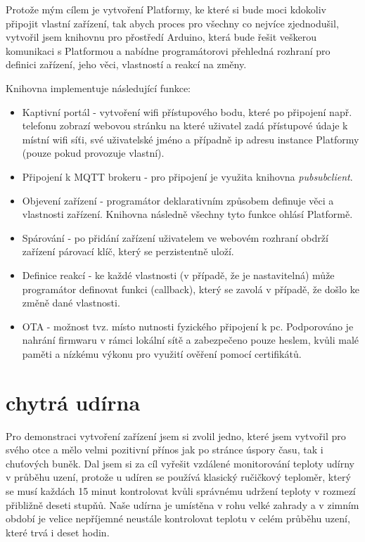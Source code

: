 Protože mým cílem je vytvoření Platformy, ke které si bude moci kdokoliv připojit vlastní zařízení, tak abych proces pro všechny co nejvíce zjednodušil, vytvořil jsem knihovnu pro přostředí Arduino, která bude řešit veškerou komunikaci s Platformou a nabídne programátorovi přehledná rozhraní pro definici zařízení, jeho věci, vlastností a reakcí na změny.

Knihovna implementuje následující funkce:
\begin{itemize}
    \item Kaptivní portál - vytvoření wifi přístupového bodu, které po připojení např. telefonu zobrazí webovou stránku na které uživatel zadá přístupové údaje k místní wifi síťi, své uživatelské jméno a případně ip adresu instance Platformy (pouze pokud provozuje vlastní).
    \item Připojení k MQTT brokeru - pro připojení je využita knihovna \textit{pubsubclient}.
    \item Objevení zařízení - programátor deklarativním způsobem definuje věci a vlastnosti zařízení. Knihovna následně všechny tyto funkce ohlásí Platformě.
    \item Spárování - po přidání zařízení uživatelem ve webovém rozhraní obdrží zařízení párovací klíč, který se perzistentně uloží.
    \item Definice reakcí - ke každé vlastnosti (v případě, že je nastavitelná) může programátor definovat funkci (callback), který se zavolá v případě, že došlo ke změně dané vlastnosti.
    \item OTA - možnost tvz.  místo nutnosti fyzického připojení k pc. Podporováno je nahrání firmwaru v rámci lokální sítě a zabezpečeno pouze heslem, kvůli malé paměti a nízkému výkonu pro využití ověření pomocí certifikátů.
\end{itemize}

\section{chytrá udírna} %
Pro demonstraci vytvoření zařízení jsem si zvolil jedno, které jsem vytvořil pro svého otce a mělo velmi pozitivní přínos jak po stránce úspory času, tak i chuťových buněk. Dal jsem si za cíl vyřešit vzdálené monitorování teploty udírny v průběhu uzení, protože u udíren se používá klasický ručičkový teploměr, který se musí každách 15 minut kontrolovat kvůli správnému udržení teploty v rozmezí přibližně deseti stupňů. Naše udírna je umístěna v rohu velké zahrady a v zimním období je velice nepříjemné neustále kontrolovat teplotu v celém průběhu uzení, které trvá i deset hodin.

